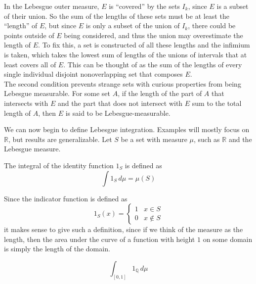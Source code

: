 \documentclass[12pt, letterpaper]{report}
\begin{document}
\begin{intuition}
    In the Lebesgue outer measure, \(E\) is ``covered'' by the sets \(I_k\), since \(E\) is a subset of their union. So the sum of the lengths of these sets must be at least the ``length'' of \(E\), but since \(E\) is only a subset of the union of \(I_k\), there could be points outside of \(E\) being considered, and thus the union may overestimate the length of \(E\). To fix this, a set is constructed of all these lengths and the infimium is taken, which takes the lowest sum of lengths of the unions of intervals that at least covers all of \(E\). This can be thought of as the sum of the lengths of every single individual disjoint nonoverlapping set that composes \(E\).\\
    The second condition prevents strange sets with curious properties from being Lebesgue measurable. For some set \(A\), if the length of the part of \(A\) that intersects with \(E\) and the part that does not intersect with \(E\) sum to the total length of \(A\), then \(E\) is said to be Lebesgue-measurable.
\end{intuition}
We can now begin to define Lebesgue integration. Examples will mostly focus on \(\mathbb{R} \), but results are generalizable. Let \(S\) be a set with measure \(\mu \), such as \(\mathbb{R} \) and the Lebesgue measure.
\begin{definition}\label{lebint1}
    The integral of the identity function \(1_S\) is defined as 
    \[
        \int 1_S\,d \mu =\mu (S)
    \]
\end{definition}
Since the indicator function is defined as 
\[
    1_S(x) =\left\{
    \begin{array}{cc}
    1&x\in S\\
    0&x\notin S
\end{array}
    \right.
\]
it makes sense to give such a definition, since if we think of the measure as the length, then the area under the curve of a function with height \(1\) on some domain is simply the length of the domain.
\begin{exercise}
    \[
        \int_{[0,1]}1_\mathbb{Q}\,d \mu 
    \]
\end{exercise}
\end{document}
